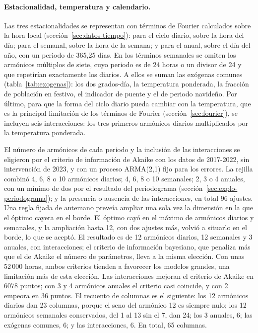 \paragraph{Estacionalidad, temperatura y calendario.} Las tres
estacionalidades se representan con términos de Fourier calculados sobre la
hora local (sección~\ref{sec:datos-tiempo}): para el ciclo diario, sobre la
hora del día; para el semanal, sobre la hora de la semana; y para el anual,
sobre el día del año, con un periodo de 365,25 días. En los términos
semanales se omiten los armónicos múltiplos de siete, cuyo periodo es de 24
horas o un divisor de 24 y que repetirían exactamente los diarios. A ellos se
suman las exógenas comunes (tabla~\ref{tab:exogenas}): los dos grados-día, la
temperatura ponderada, la fracción de población en festivo, el indicador de
puente y el de periodo navideño. Por último, para que la forma del ciclo
diario pueda cambiar con la temperatura, que es la principal limitación de
los términos de Fourier (sección~\ref{sec:fourier}), se incluyen seis
interacciones: los tres primeros armónicos diarios multiplicados por la
temperatura ponderada.

El número de armónicos de cada periodo y la inclusión de las interacciones
se eligieron por el criterio de información de Akaike con los datos de
2017-2022, sin intervención de 2023, y con un proceso ARMA(2,1) fijo para
los errores. La rejilla combinó 4, 6, 8 o 10 armónicos diarios; 4, 6, 8 o 10
semanales; 2, 3 o 4 anuales, con un mínimo de dos por el resultado del
periodograma (sección~\ref{sec:explo-periodograma}); y la presencia o
ausencia de las interacciones, en total 96 ajustes. Una regla fijada de
antemano preveía ampliar una sola vez la dimensión en la que el óptimo cayera
en el borde. El óptimo cayó en el máximo de armónicos diarios y semanales, y
la ampliación hasta 12, con dos ajustes más, volvió a situarlo en el borde, lo
que se aceptó. El resultado es de 12 armónicos diarios, 12
semanales y 3 anuales, con interacciones; el criterio de información
bayesiano, que penaliza más que el de Akaike el número de parámetros, lleva a
la misma elección. Con unas 52\,000 horas, ambos criterios tienden a
favorecer los modelos grandes, una limitación más de esta elección. Las
interacciones mejoran el criterio de Akaike en 6078 puntos; con 3 y 4
armónicos anuales el criterio casi coincide, y con 2 empeora en 36 puntos.
El recuento de columnas es el siguiente: los 12 armónicos diarios
dan 23 columnas, porque el seno del armónico 12 es siempre nulo; los 12
armónicos semanales conservados, del 1 al 13 sin el 7, dan 24; los 3
anuales, 6; las exógenas comunes, 6; y las interacciones, 6. En total, 65
columnas.

